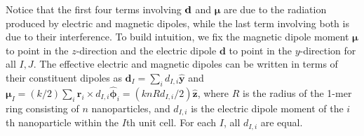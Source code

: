 \documentclass [11pt, proquest] {uwthesis}[2016/11/22]
\begin{document}
Notice that the first four terms involving $\bf d$ and $\boldsymbol\mu$ are due to the radiation produced by electric and magnetic dipoles, while the last term involving both is due to their interference. To build intuition, we fix the magnetic dipole moment $\boldsymbol{\mu}$ to point in the $z$-direction and the electric dipole $\textbf{d}$ to point in the $y$-direction for all $I,J.$ The effective electric and magnetic dipoles can be written in terms of their constituent dipoles as $\textbf{d}_I = \sum_i d_{I,i} \hat{\textbf{y}}$ and $\boldsymbol{\mu}_I = ({k}/{2})\sum_i\textbf{r}_i \times d_{I,i} \hat{\boldsymbol{\phi}}_i = ({knRd_{I,i}}/{2})\hat{\textbf{z}}$, where $R$ is the radius of the 1-mer ring consisting of $n$ nanoparticles, and $d_{I,i}$ is the electric dipole moment of the $i$th nanoparticle within the $I$th unit cell. For each $I$, all $d_{I,i}$ are equal.
\end{document}
